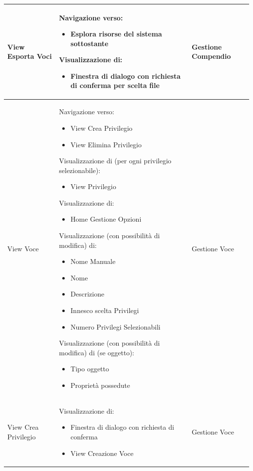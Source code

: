 \documentclass[a4paper, 11pt]{article}
\begin{document}
\begin{adjustwidth}{-1.5cm}{-1.5cm}
\begin{center}
\begin{longtable}{|p{5cm}|p{5cm}|p{5cm}|}
        View Esporta Voci & 
        Navigazione verso:
        \begin{itemize}
            \item Esplora risorse del sistema sottostante
        \end{itemize}
        Visualizzazione di:
        \begin{itemize}
            \item Finestra di dialogo con richiesta di conferma per scelta file
        \end{itemize} & 
        Gestione Compendio \\ \hline
        
        View Voce & 
        Navigazione verso:
        \begin{itemize}
            \item View Crea Privilegio
            \item View Elimina Privilegio
        \end{itemize}
        Visualizzazione di (per ogni privilegio selezionabile):
        \begin{itemize}
            \item View Privilegio
        \end{itemize}
        Visualizzazione di:
        \begin{itemize}
            \item Home Gestione Opzioni
        \end{itemize}
        Visualizzazione (con possibilità di modifica) di:
        \begin{itemize}
            \item Nome Manuale
            \item Nome
            \item Descrizione
            \item Innesco scelta Privilegi
            \item Numero Privilegi Selezionabili
        \end{itemize}
        Visualizzazione (con possibilità di modifica) di (se oggetto):
        \begin{itemize}
            \item Tipo oggetto
            \item Proprietà possedute
        \end{itemize} & 
        Gestione Voce \\ \hline
        
        View Crea Privilegio & 
        Visualizzazione di:
        \begin{itemize}
            \item Finestra di dialogo con richiesta di conferma
            \item View Creazione Voce
        \end{itemize} & 
        Gestione Voce \\ \hline
        

\end{longtable}
\end{center}
\end{adjustwidth}
\end{document}
